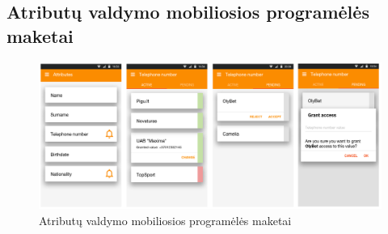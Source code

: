 \begin{landscape}

\section{Atributų valdymo mobiliosios programėlės maketai} \label{appendix:appSketches}

\begin{figure}[H]
    \centering
    \includegraphics[scale=1]{img/appSketches}
    \caption{Atributų valdymo mobiliosios programėlės maketai}
    \label{img:appSketches}
\end{figure}

\end{landscape}
